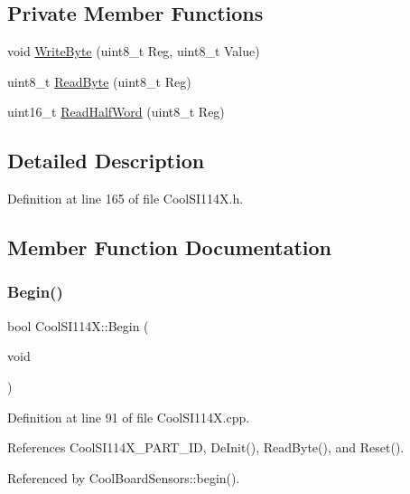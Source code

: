 \subsection*{Private Member Functions}
\begin{DoxyCompactItemize}
\item 
void \hyperlink{class_cool_s_i114_x_ac5c8dc5ade604da7a1c8cd1586feefc2}{Write\+Byte} (uint8\+\_\+t Reg, uint8\+\_\+t Value)
\item 
uint8\+\_\+t \hyperlink{class_cool_s_i114_x_acc20f8037e156ec4aadcbe90780b1e8b}{Read\+Byte} (uint8\+\_\+t Reg)
\item 
uint16\+\_\+t \hyperlink{class_cool_s_i114_x_a1d25c9e137874af529804c2ec796a6b9}{Read\+Half\+Word} (uint8\+\_\+t Reg)
\end{DoxyCompactItemize}


\subsection{Detailed Description}


Definition at line 165 of file Cool\+S\+I114\+X.\+h.



\subsection{Member Function Documentation}
\mbox{\label{class_cool_s_i114_x_a206b36aca7049f63be1d11088c30a09f}} 
\subsubsection{\texorpdfstring{Begin()}{Begin()}}
{\footnotesize\ttfamily bool Cool\+S\+I114\+X\+::\+Begin (\begin{DoxyParamCaption}\item[{void}]{ }\end{DoxyParamCaption})}



Definition at line 91 of file Cool\+S\+I114\+X.\+cpp.



References Cool\+S\+I114\+X\+\_\+\+P\+A\+R\+T\+\_\+\+ID, De\+Init(), Read\+Byte(), and Reset().



Referenced by Cool\+Board\+Sensors\+::begin().

